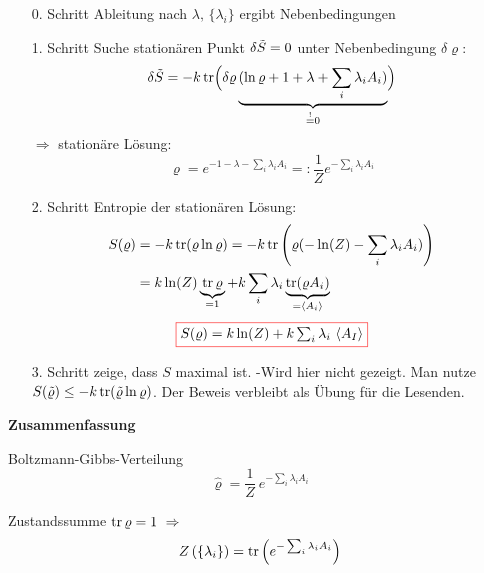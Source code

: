 \begin{enumerate}
    \item[0. Schritt] Ableitung nach $\lambda, \, \{\lambda_i\}$ ergibt Nebenbedingungen
    \item[1. Schritt] Suche stationären Punkt $\delta\Tilde{S} =0$ unter Nebenbedingung $\delta\varrho$:
    \begin{equation}
        \delta\Tilde{S} = -k \trace \Bigl( \delta \varrho  \underbrace{(\ln \varrho +1 + \lambda+\sum_i \lambda_i A_i)}_{\stackrel{!}{=}0} \Bigr)
    \end{equation}
    $\Rightarrow$ stationäre Lösung:
    \begin{equation}
        \varrho= e^{-1-\lambda -\sum_i \lambda_i A_i} =: \frac{1}{Z} e^{-\sum_i \lambda_i A_i}
    \end{equation}
    \item[2. Schritt] Entropie der stationären Lösung:
    \begin{align}
        S(\varrho)&= -k \trace(\varrho \ln \varrho) =-k \trace\left( \varrho( -\ln(Z) - \sum_i \lambda_i A_i )\right) \\
        &=k \ln(Z) \underbrace{\trace \varrho}_{=1} +k \sum_i \lambda_i \underbrace{\trace(\varrho A_i)}_{= \langle A_i\rangle}
    \end{align}
    \begin{equation}
      \fcolorbox{red}{white}{$S(\varrho) =k \ln (Z) + k \sum_i \lambda_i \ \langle A_I\rangle$}
    \end{equation} \color{black!50!white}
    \item[3. Schritt] zeige, dass $S$ maximal ist. -Wird hier nicht gezeigt. Man nutze $S(\Tilde{\varrho } ) \leq -k \trace(\Tilde{\varrho} \ln \varrho)$. Der Beweis verbleibt als Übung für die Lesenden.
\end{enumerate}
\color{black}

\textbf{Zusammenfassung}

\begin{definition}{Boltzmann-Gibbs-Verteilung}
    \begin{equation}
        \hat{\varrho} = \frac{1}{Z} \ e^{-\sum_i \lambda_i A_i }
    \end{equation}
\end{definition}

\begin{definition}{Zustandssumme}
    $\trace\varrho=1 \ \Rightarrow$
    \begin{equation}
        Z\left( \{ \lambda_i\}\right) = \trace\left( e^{-\sum_i \lambda_i A_i}\right)
    \end{equation}
\end{definition}

